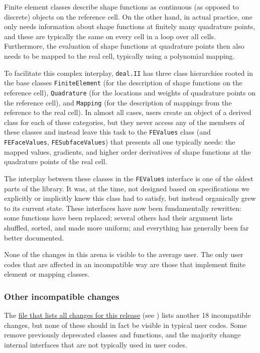 \documentclass{ansarticle-preprint}
\newcommand{\specialword}[1]{\texttt{#1}}
\newcommand{\dealii}{{\specialword{deal.II}}}
\begin{document}
Finite element classes describe shape functions as continuous (as
opposed to discrete) objects on the reference cell. On the other hand,
in actual practice, one only needs information about shape functions
at finitely many quadrature points, and these are typically the same
on every cell in a loop over all cells. Furthermore, the evaluation of
shape functions at quadrature points then also needs to be mapped to
the real cell, typically using a polynomial mapping.

To facilitate this complex interplay, \dealii{} has three class
hierarchies rooted in the base classes \texttt{FiniteElement} (for the
description of shape functions on the reference cell),
\texttt{Quadrature} (for the locations and weights of quadrature
points on the reference cell), and \texttt{Mapping} (for the
description of mappings from the reference to the real cell). In
almost all cases, users create an object of a derived class for each
of these categories, but they never access any of the members of these
classes and instead leave this task to the \texttt{FEValues} class
(and \texttt{FEFaceValues}, \texttt{FESubfaceValues}) that presents
all one typically needs: the mapped values, gradients, and
higher order derivatives of shape functions at the quadrature points
of the real cell.

The interplay between these classes in the \texttt{FEValues} interface
is one of the oldest parts of the library. It was, at the time, not
designed based on specifications we explicitly or implicitly knew this
class had to satisfy, but instead organically grew to its current
state. These interfaces have now been fundamentally rewritten: some
functions have been replaced; several others had their argument lists
shuffled, sorted, and made more uniform; and everything has generally
been far better documented.

None of the changes in this arena is visible to the average user. The
only user codes that are affected in an incompatible way are those
that implement finite element or mapping classes.

\subsubsection{Other incompatible changes}

The
\href{https://www.dealii.org/8.4.0/doxygen/deal.II/changes_between_8_3_and_8_4.html}{file
  that lists all changes for this release} (see \cite{changes84}) lists another 18
incompatible changes, but none of these should in fact be visible in
typical user codes. Some remove previously deprecated classes and
functions, and the majority change internal interfaces that are not
typically used in user codes.
\end{document}
